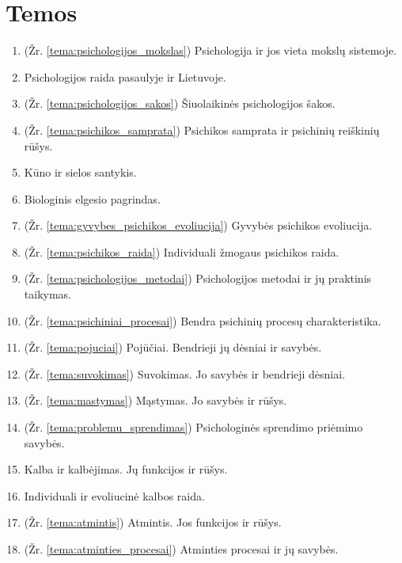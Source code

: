\chapter{Temos}

\begin{enumerate}
  \item \label{tema_01} (Žr. \ref{tema:psichologijos_mokslas})
    Psichologija ir jos vieta mokslų sistemoje.
  \item \label{tema_02} Psichologijos raida pasaulyje ir Lietuvoje.
  \item \label{tema_03} (Žr. \ref{tema:psichologijos_sakos})
  Šiuolaikinės psichologijos šakos.
  \item \label{tema_04} (Žr. \ref{tema:psichikos_samprata})
    Psichikos samprata ir psichinių reiškinių rūšys.
  \item \label{tema_05} Kūno ir sielos santykis.
  \item \label{tema_06} Biologinis elgesio pagrindas.
  \item \label{tema_07} (Žr. \ref{tema:gyvybes_psichikos_evoliucija})
  Gyvybės psichikos evoliucija.
  \item \label{tema_10} (Žr. \ref{tema:psichikos_raida})
  Individuali žmogaus psichikos raida.
  \item \label{tema_11} (Žr. \ref{tema:psichologijos_metodai})
  Psichologijos metodai ir jų praktinis taikymas.
  \item \label{tema_12} (Žr. \ref{tema:psichiniai_procesai})
    Bendra psichinių procesų charakteristika.
  \item \label{tema_13} (Žr. \ref{tema:pojuciai})
    Pojūčiai. Bendrieji jų dėsniai ir savybės.
  \item \label{tema_14} (Žr. \ref{tema:suvokimas})
    Suvokimas. Jo savybės ir bendrieji dėsniai.
  \item \label{tema_15} (Žr. \ref{tema:mastymas})
    Mąstymas. Jo savybės ir rūšys.
  \item \label{tema_16} (Žr. \ref{tema:problemu_sprendimas})
    Psichologinės sprendimo priėmimo savybės.
  \item \label{tema_17} Kalba ir kalbėjimas. Jų funkcijos ir rūšys.
  \item \label{tema_20} Individuali ir evoliucinė kalbos raida.
  \item \label{tema_21} (Žr. \ref{tema:atmintis})
    Atmintis. Jos funkcijos ir rūšys.
  \item \label{tema_22} (Žr. \ref{tema:atminties_procesai})
    Atminties procesai ir jų savybės.

\end{enumerate}
